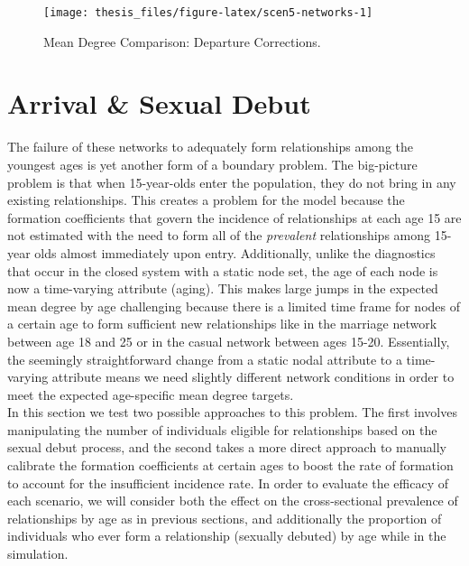 \documentclass [11pt, proquest] {uwthesis}[2015/03/03]
\begin{document}
\begin{figure}

{\centering \texttt{[image: thesis\_files/figure-latex/scen5-networks-1]} 

}

\caption{Mean Degree Comparison: Departure Corrections.}\label{fig:scen5-networks}
\end{figure}
\hypertarget{arrival-sexual-debut}{%
\section{Arrival \& Sexual Debut}\label{arrival-sexual-debut}}

The failure of these networks to adequately form relationships among the youngest ages is yet another form of a boundary problem. The big-picture problem is that when 15-year-olds enter the population, they do not bring in any existing relationships. This creates a problem for the model because the formation coefficients that govern the incidence of relationships at each age 15 are not estimated with the need to form all of the \emph{prevalent} relationships among 15-year olds almost immediately upon entry. Additionally, unlike the diagnostics that occur in the closed system with a static node set, the age of each node is now a time-varying attribute (aging). This makes large jumps in the expected mean degree by age challenging because there is a limited time frame for nodes of a certain age to form sufficient new relationships like in the marriage network between age 18 and 25 or in the casual network between ages 15-20. Essentially, the seemingly straightforward change from a static nodal attribute to a time-varying attribute means we need slightly different network conditions in order to meet the expected age-specific mean degree targets.\\
In this section we test two possible approaches to this problem. The first involves manipulating the number of individuals eligible for relationships based on the sexual debut process, and the second takes a more direct approach to manually calibrate the formation coefficients at certain ages to boost the rate of formation to account for the insufficient incidence rate. In order to evaluate the efficacy of each scenario, we will consider both the effect on the cross-sectional prevalence of relationships by age as in previous sections, and additionally the proportion of individuals who ever form a relationship (sexually debuted) by age while in the simulation.
\end{document}
